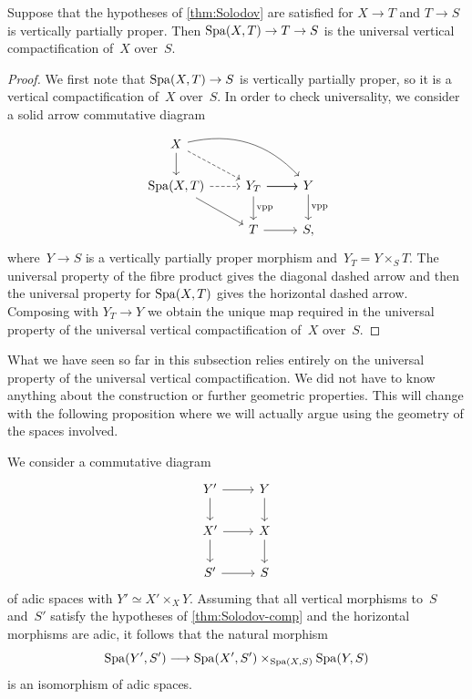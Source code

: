 \begin{prop} \label{prop:Spa-iso-vpp}
    Suppose that the hypotheses of \cref{thm:Solodov} are satisfied for $X \to T$ and $T \to S$ is vertically partially proper.
    Then $\operatorname{Spa}(X,T) \to T \to S$ is the universal vertical compactification of~$X$ over~$S$.
\end{prop}

\begin{proof}
    We first note that $\operatorname{Spa}(X,T) \to S$ is vertically partially proper, so it is a vertical compactification of~$X$ over~$S$.
    In order to check universality, we consider a solid arrow commutative diagram
    \[
        \begin{tikzcd}
             X  \ar[drr,bend left]   \ar[dr,dashed] \ar[d]  \\
             \Spa(X,T) \ar[r,dashed] \ar[dr] & Y_T \ar[r] \ar[d,"\rm vpp"] \ar[r] & Y \ar[d,"\rm vpp"] \\
             & T \ar[r] & S,
        \end{tikzcd}
    \]
    where~$Y \to S$ is a vertically partially proper morphism and~$Y_T = Y \times_S T$.
    The universal property of the fibre product gives the diagonal dashed arrow and then the universal property for $\operatorname{Spa}(X,T)$ gives the horizontal dashed arrow.
    Composing with $Y_T \to Y$ we obtain the unique map required in the universal property of the universal vertical compactification of~$X$ over~$S$.
\end{proof}

What we have seen so far in this subsection relies entirely on the universal property of the universal vertical compactification.
We did not have to know anything about the construction or further geometric properties.
This will change with the following proposition where we will actually argue using the geometry of the spaces involved.

\begin{prop} \label{prop:comp-fibre-product}
    We consider a commutative diagram
        \[ 
            \begin{tikzcd}
                Y'\ar[r] \ar[d] & Y \ar[d] \\
                X'\ar[r] \ar[d] & X \ar[d] \\
                S'\ar[r]  & S
            \end{tikzcd}
        \]
    of adic spaces with $Y' \simeq X' \times_X Y$.
    Assuming that all vertical morphisms to~$S$ and~$S'$ satisfy the hypotheses of \cref{thm:Solodov-comp} and the horizontal morphisms  are adic, it follows that the natural morphism
    \[
     \operatorname{Spa}(Y',S') \longrightarrow \operatorname{Spa}(X',S') \times_{\operatorname{Spa}(X,S)} \operatorname{Spa}(Y,S)
    \]
    is an isomorphism of adic spaces.
\end{prop}

